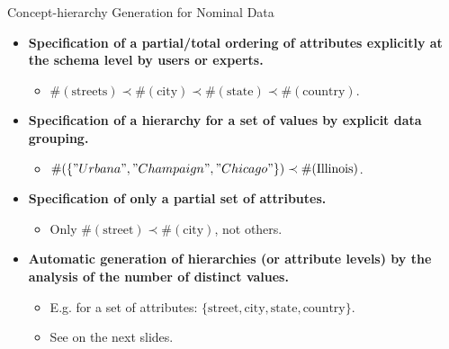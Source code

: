 \begin{frame}{Concept-hierarchy Generation for Nominal Data}
	\begin{itemize}
		\item \textbf{Specification of a partial/total ordering of attributes
			      explicitly at the schema level by users or experts.}
		      \begin{itemize}
			      \item $\#(\text{streets}) \prec \#(\text{city}) \prec
				            \#(\text{state}) \prec \#(\text{country})$.
		      \end{itemize}
		\item \textbf{Specification of a hierarchy for a set of values by
			      explicit data grouping.}
		      \begin{itemize}
			      \item $\#(\{"Urbana", "Champaign", "Chicago"\}) \prec
				            \#(\text{Illinois})$.
		      \end{itemize}
		\item \textbf{Specification of only a partial set of attributes.}
		      \begin{itemize}
			      \item Only $\#(\text{street}) \prec \#(\text{city})$, not others.
		      \end{itemize}
		\item \textbf{Automatic generation of hierarchies (or attribute levels)
			      by the analysis of the number of distinct values.}
		      \begin{itemize}
			      \item E.g. for a set of attributes: $\{\text{street}, \text{city},
				            \text{state}, \text{country}\}$.
			      \item See on the next slides.
		      \end{itemize}
	\end{itemize}
\end{frame}

